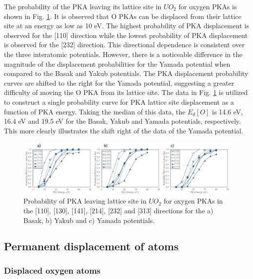 \documentclass[8pt]{article}   	%
\begin{document}
The probability of the PKA leaving its lattice site in $UO_2$ for oxygen PKAs is shown in Fig. \ref{fig:lato}. It is observed that O PKAs can be displaced from their lattice site at an energy as low as 10 eV. The highest probability of PKA displacement is observed for the [110] direction while the lowest probability of PKA displacement is observed for the [232] direction. This directional dependence is consistent over the three interatomic potentials. However, there is a noticeable difference in the magnitude of the displacement probabilities for the Yamada potential when compared to the Basak and Yakub potentials. The PKA displacement probability curves are shifted to the right for the Yamada potential, suggesting a greater difficulty of moving the O PKA from its lattice site. The data in Fig. \ref{fig:lato} is utilized to construct a single probability curve for PKA lattice site displacement as a function of PKA energy. Taking the median of this data, the $E_d [O]$ is 14.6 eV, 16.4 eV and 19.5 eV for the Basak, Yakub and Yamada potentials, respectively. This more clearly illustrates the shift right of the data of the Yamada potential. 

\begin{figure}[h]
 \centering
 \includegraphics[width=1.0\textwidth]{lat_O.png} 
 \caption{Probability of PKA leaving lattice site in $UO_2$ for oxygen PKAs in the [110], [130], [141], [214], [232] and [313] directions for the a) Basak, b) Yakub and c) Yamada potentials.  }
 \label{fig:lato}
\end{figure}

\FloatBarrier

\subsection{Permanent displacement of atoms}
\subsubsection{Displaced oxygen atoms}
\hspace{5mm}
\end{document}
